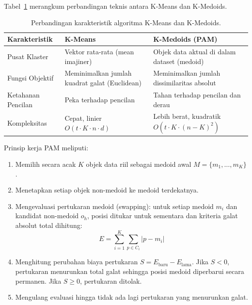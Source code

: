 \documentclass[a4paper,oneside,12pt]{report}
\begin{document}
Tabel~\ref{tab:kmeans-vs-kmedoids} merangkum perbandingan teknis antara K-Means dan K-Medoids.

\begin{table}[H]
\centering
\small
\begin{tabularx}{\textwidth}{>{\raggedright\arraybackslash}p{3cm} >{\raggedright\arraybackslash}X >{\raggedright\arraybackslash}X}
\toprule
\textbf{Karakteristik} & \textbf{K-Means} & \textbf{K-Medoids (PAM)} \\
\midrule
Pusat Klaster & Vektor rata-rata (mean imajiner) & Objek data aktual di dalam dataset (medoid) \\
Fungsi Objektif & Meminimalkan jumlah kuadrat galat (Euclidean) & Meminimalkan jumlah dissimilaritas absolut \\
Ketahanan Pencilan & Peka terhadap pencilan \cite{tan2019} & Tahan terhadap pencilan dan derau \cite{herviany2021} \\
Kompleksitas & Cepat, linier $O(t \cdot K \cdot n \cdot d)$ \cite{sulistiyawati2021} & Lebih berat, kuadratik $O(t \cdot K \cdot (n-K)^2)$ \\
\bottomrule
\end{tabularx}
\caption{Perbandingan karakteristik algoritma K-Means dan K-Medoids.}
\label{tab:kmeans-vs-kmedoids}
\end{table}

Prinsip kerja PAM meliputi:
\begin{enumerate}
    \item Memilih secara acak $K$ objek data riil sebagai medoid awal $M = \{m_1, \dots, m_K\}$.
    \item Menetapkan setiap objek non-medoid ke medoid terdekatnya.
    \item Mengevaluasi pertukaran medoid (swapping): untuk setiap medoid $m_i$ dan kandidat non-medoid $o_h$, posisi ditukar untuk sementara dan kriteria galat absolut total dihitung:
    \begin{equation}
    E = \sum_{i=1}^{K} \sum_{p \in C_i} |p - m_i|
    \end{equation}
    \item Menghitung perubahan biaya pertukaran $S = E_{\text{baru}} - E_{\text{lama}}$. Jika $S < 0$, pertukaran menurunkan total galat sehingga posisi medoid diperbarui secara permanen. Jika $S \ge 0$, pertukaran ditolak.
    \item Mengulang evaluasi hingga tidak ada lagi pertukaran yang menurunkan galat.
\end{enumerate}
\end{document}
